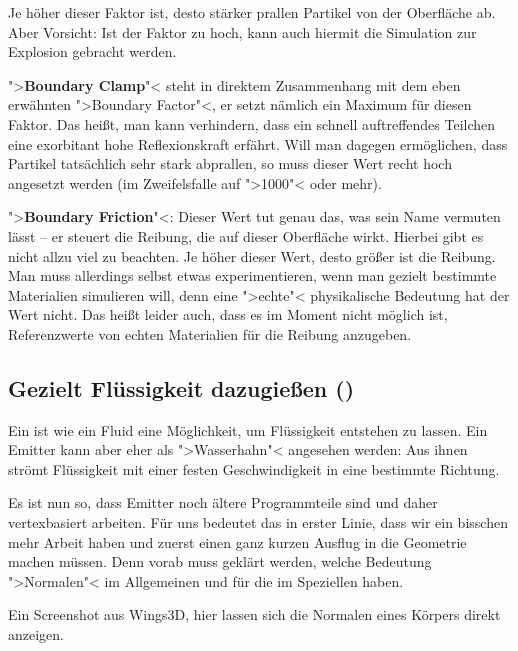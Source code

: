 \documentclass[10pt,DIV=14,a4paper]{scrartcl}
\begin{document}
	Je höher dieser Faktor ist, desto stärker prallen Partikel von der
	Oberfläche ab. Aber Vorsicht: Ist der Faktor zu hoch, kann auch
	hiermit die Simulation zur Explosion gebracht werden.

	\item ">\textbf{Boundary Clamp}"< steht in direktem Zusammenhang mit
	dem eben erwähnten ">Boundary Factor"<, er setzt nämlich ein Maximum
	für diesen Faktor. Das heißt, man kann verhindern, dass ein schnell
	auftreffendes Teilchen eine exorbitant hohe Reflexionskraft erfährt.
	Will man dagegen ermöglichen, dass Partikel tatsächlich sehr stark
	abprallen, so muss dieser Wert recht hoch angesetzt werden (im
	Zweifelsfalle auf ">1000"< oder mehr).

	\item ">\textbf{Boundary Friction}"<: Dieser Wert tut genau das, was
	sein Name vermuten lässt -- er steuert die Reibung, die auf dieser
	Oberfläche wirkt. Hierbei gibt es nicht allzu viel zu beachten. Je
	höher dieser Wert, desto größer ist die Reibung. Man muss allerdings
	selbst etwas experimentieren, wenn man gezielt bestimmte Materialien
	simulieren will, denn eine ">echte"< physikalische Bedeutung hat der
	Wert nicht. Das heißt leider auch, dass es im Moment nicht möglich
	ist, Referenzwerte von echten Materialien für die Reibung anzugeben.

\itE


\subsection{Gezielt Flüssigkeit dazugießen ()}
Ein  ist wie ein Fluid eine Möglichkeit, um Flüssigkeit
entstehen zu lassen. Ein Emitter kann aber eher als ">Wasserhahn"<
angesehen werden: Aus ihnen strömt Flüssigkeit mit einer festen
Geschwindigkeit in eine bestimmte Richtung.

Es ist nun so, dass Emitter noch ältere Programmteile sind und daher
vertexbasiert arbeiten. Für uns bedeutet das in erster
Linie, dass wir ein bisschen mehr Arbeit haben und zuerst einen ganz
kurzen Ausflug in die Geometrie machen müssen. Denn vorab muss geklärt
werden, welche Bedeutung ">Normalen"< im Allgemeinen und für die
\fluidsim im Speziellen haben.

{Ein Screenshot aus Wings3D, hier lassen sich die Normalen eines Körpers
direkt anzeigen.}
\end{document}
